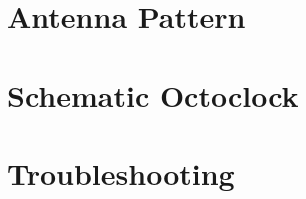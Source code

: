 \chapter{Antenna Pattern}
\label{ch:AntennaPat}

\chapter{Schematic Octoclock}
\label{ch:HWSchOctoClock}





\chapter{Troubleshooting}
\label{ch:troubleshooting}
